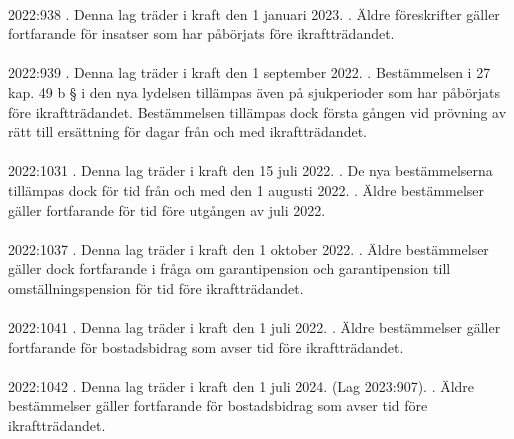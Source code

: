 \documentclass[a4paper,notitlepage,openany,10pt]{book}
\begin{document}
\paragraph*{}
2022:938
. Denna lag träder i kraft den 1 januari 2023.
. Äldre föreskrifter gäller fortfarande för insatser som har påbörjats före ikraftträdandet.
\paragraph*{}
2022:939
. Denna lag träder i kraft den 1 september 2022.
. Bestämmelsen i 27 kap. 49 b § i den nya lydelsen tillämpas även på sjukperioder som har påbörjats före ikraftträdandet. Bestämmelsen tillämpas dock första gången vid prövning av rätt till ersättning för dagar från och med ikraftträdandet.
\paragraph*{}
2022:1031
. Denna lag träder i kraft den 15 juli 2022.
. De nya bestämmelserna tillämpas dock för tid från och med den 1 augusti 2022.
. Äldre bestämmelser gäller fortfarande för tid före utgången av juli 2022.
\paragraph*{}
2022:1037
. Denna lag träder i kraft den 1 oktober 2022.
. Äldre bestämmelser gäller dock fortfarande i fråga om garantipension och garantipension till omställningspension för tid före ikraftträdandet.
\paragraph*{}
2022:1041
. Denna lag träder i kraft den 1 juli 2022.
. Äldre bestämmelser gäller fortfarande för bostadsbidrag som avser tid före ikraftträdandet.
\paragraph*{}
2022:1042
. Denna lag träder i kraft den 1 juli 2024. (Lag 2023:907).
. Äldre bestämmelser gäller fortfarande för bostadsbidrag som avser tid före ikraftträdandet.
\end{document}
